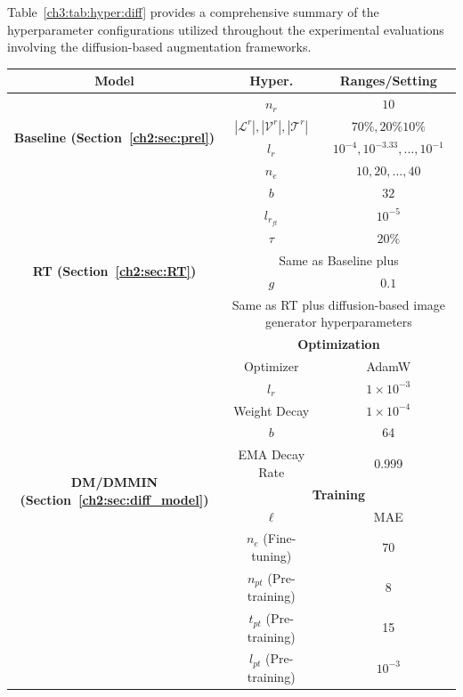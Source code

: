 Table~\ref{ch3:tab:hyper:diff} provides a comprehensive summary of the hyperparameter configurations utilized throughout the experimental evaluations involving the diffusion-based augmentation frameworks.
%
\begin{table}
\footnotesize
\centering
\setlength{\tabcolsep}{0.1cm}
\renewcommand{\arraystretch}{1.5}
\centering
\begin{tabular}{c|c|c}
\toprule
\textbf{Model} & \textbf{Hyper.} & \textbf{Ranges/Setting} \\
\midrule
\multirow{4}{*}{\textbf{Baseline (Section~\ref{ch2:sec:prel})}} & $n_r$ & $10$ \\
\hhline{~--}
& $|\mathcal{L}^r|, |\mathcal{V}^r|, |\mathcal{T}^r|$& $70\%, 20\% 10\%$ \\
\hhline{~--}
& $l_r$ & $10^{-4}, 10^{-3.33}, \dots, 10^{-1}$\\
\hhline{~--}
& $n_e$ & $10, 20, \dots, 40$\\
\hhline{~--}
& $b$ & $32$\\
\hhline{~--}
& $l_{r_{ft}}$ & $10^{-5}$\\
\hhline{~--}
& $\tau$ & $20\%$\\
\midrule
\multirow{2}{*}{\textbf{RT (Section~\ref{ch2:sec:RT})}} & \multicolumn{2}{c}{Same as Baseline plus}\\
\hhline{~--}
 & $g$ &  $0.1$\\
\midrule
\multirow{20}{*}{\textbf{DM/DMMIN (Section~\ref{ch2:sec:diff_model})}} & \multicolumn{2}{c}{Same as RT plus diffusion-based image generator hyperparameters}\\
\hhline{~--}
& \multicolumn{2}{c}{\textbf{Optimization}}\\
\hhline{~--}
 & Optimizer & AdamW \\ 
\hhline{~--}
 & $l_r$ & $1 \times 10^{-3}$ \\ 
\hhline{~--}
 & Weight Decay & $1 \times 10^{-4}$ \\ 
\hhline{~--}
 & $b$ & 64 \\ 
\hhline{~--}
 & EMA Decay Rate & 0.999 \\
\hhline{~--}
& \multicolumn{2}{c}{\textbf{Training}}\\
\hhline{~--}
 & $\ell$  & MAE \\ 
\hhline{~--}
& $n_e$ (Fine-tuning) & 70 \\
\hhline{~--}
& $n_{pt}$ (Pre-training) & 8 \\
\hhline{~--}
& $t_{pt}$ (Pre-training) & 15 \\
\hhline{~--}
& $l_{pt}$ (Pre-training)  & $10^{-3}$ \\

\end{tabular}
\end{table}
